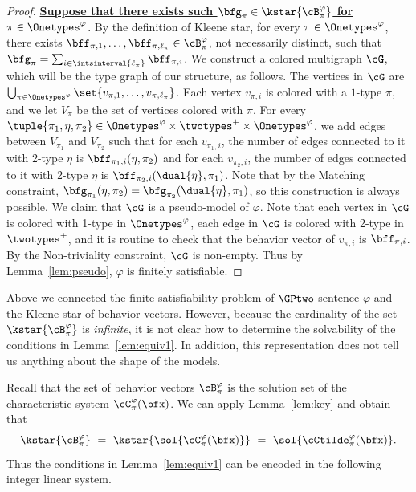 \begin{proof}
    \textbf{\uline{Suppose that there exists such $\bfg_\pi \in \kstar{\cB^\varphi_\pi}$ for $\pi \in \Onetypes^\varphi$}}.
    By the definition of Kleene star,
    for every $\pi \in \Onetypes^\varphi$,
    there exists $\bff_{\pi, 1}, \ldots, \bff_{\pi, \ell_\pi} \in \cB^\varphi_\pi$,
    not necessarily distinct,
    such that $\bfg_\pi = \sum_{i \in \intsinterval{\ell_\pi}} \bff_{\pi, i}$. 
    We construct a colored multigraph $\cG$, which will be the type graph of our structure, as follows.
    The vertices in $\cG$ are
    $\bigcup_{\pi \in \Onetypes^\varphi}
    \set{v_{\pi, 1}, \ldots, v_{\pi, \ell_\pi}}$.
    Each vertex $v_{\pi, i}$ is colored with a $1$-type $\pi$,
    and we let $V_{\pi}$ be the set of vertices colored with $\pi$.
    For every $\tuple{\pi_1, \eta, \pi_2} \in \Onetypes^\varphi \times \twotypes^+ \times \Onetypes^\varphi$,
    we add edges between $V_{\pi_1}$ and $V_{\pi_2}$ 
    such that
    for each $v_{\pi_1, i}$, the number of edges connected to it with 2-type $\eta$ is $\bff_{\pi_1, i}(\eta, \pi_2)$ and 
    for each $v_{\pi_2, i}$, the number of edges connected to it with 2-type $\eta$ is $\bff_{\pi_2, i}(\dual{\eta}, \pi_1)$.
    Note that by the Matching constraint,
    $\bfg_{\pi_1}(\eta, \pi_2) = \bfg_{\pi_2}(\dual{\eta}, \pi_1)$,
    so this construction is always possible.
    We claim that $\cG$ is a pseudo-model of $\varphi$.
    Note that each vertex in $\cG$ is colored with 1-type in $\Onetypes^\varphi$,
    each edge in $\cG$ is colored with 2-type in $\twotypes^+$,
    and it is routine to check that the behavior vector of $v_{\pi, i}$ is $\bff_{\pi, i}$.
    By the Non-triviality constraint, $\cG$ is non-empty.
    Thus by Lemma~\ref{lem:pseudo}, $\varphi$ is finitely satisfiable.
\end{proof}

Above we connected the finite satisfiability problem of $\GPtwo$ sentence $\varphi$ and the Kleene star of behavior vectors.
However, because the cardinality of the set $\kstar{\cB^\varphi_\pi}$ is \emph{infinite},
it is not clear how  to determine the solvability of the conditions in Lemma~\ref{lem:equiv1}.
In addition, this representation does not tell us anything about the shape of the models.

Recall that the set of behavior vectors $\cB^\varphi_\pi$ is the solution set of the characteristic system $\cC^\varphi_\pi(\bfx)$.
We can apply Lemma~\ref{lem:key} and obtain that
\begin{equation*}
    \kstar{\cB^\varphi_\pi}
    \ =\ 
    \kstar{\sol{\cC^\varphi_\pi(\bfx)}}
    \ =\ 
    \sol{\cCtilde^\varphi_\pi(\bfx)}.
\end{equation*}
Thus the conditions in Lemma~\ref{lem:equiv1} can be encoded in the following integer linear system.

